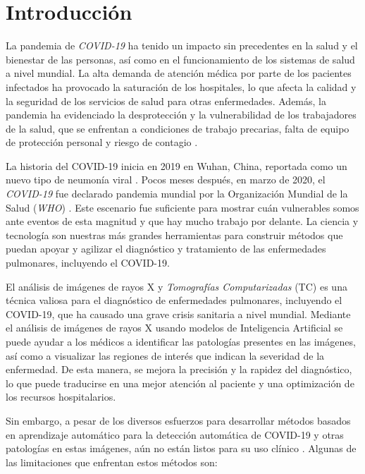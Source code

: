\chapter{Introducción}

La pandemia de \textit{COVID-19} ha tenido un impacto sin precedentes en la salud y el bienestar de las
personas, así como en el funcionamiento de los sistemas de salud a nivel mundial. La alta demanda
de atención médica por parte de los pacientes infectados ha provocado la saturación de los hospitales,
lo que afecta la calidad y la seguridad de los servicios de salud para otras enfermedades. Además,
la pandemia ha evidenciado la desprotección y la vulnerabilidad de los trabajadores de la salud,
que se enfrentan a condiciones de trabajo precarias, falta de equipo de protección personal y riesgo
de contagio \cite{demanda-hospital-mexico}.


La historia del COVID-19 inicia en 2019 en Wuhan, China, reportada como un nuevo tipo de neumonía
viral \cite{huang2020clinical}. Pocos meses después, en marzo de 2020, el \textit{COVID-19} fue
declarado pandemia mundial por la Organización Mundial de la Salud (\textit{WHO}) \cite{world2020director}.
Este escenario fue suficiente para mostrar cuán vulnerables somos ante eventos de esta magnitud y
que hay mucho trabajo por delante. La ciencia y tecnología son nuestras más grandes herramientas
para construir métodos que puedan apoyar y agilizar el diagnóstico y tratamiento de las enfermedades
pulmonares, incluyendo el COVID-19.

El análisis de imágenes de rayos X y \textit{Tomografías Computarizadas} (TC) es una técnica valiosa
para el diagnóstico de enfermedades pulmonares, incluyendo el COVID-19, que ha causado una grave
crisis sanitaria a nivel mundial. Mediante el análisis de imágenes de rayos X usando modelos de
Inteligencia Artificial se puede ayudar a los médicos a identificar las patologías presentes en las
imágenes, así como a visualizar las regiones de interés que indican la severidad de la enfermedad.
De esta manera, se mejora la precisión y la rapidez del diagnóstico, lo que puede traducirse en una
mejor atención al paciente y una optimización de los recursos hospitalarios.

Sin embargo, a pesar de los diversos esfuerzos para desarrollar métodos basados en aprendizaje
automático para la detección automática de COVID-19 y otras patologías en estas imágenes, aún no
están listos para su uso clínico \cite{roberts2021common}. Algunas de las limitaciones que enfrentan
estos métodos son:

